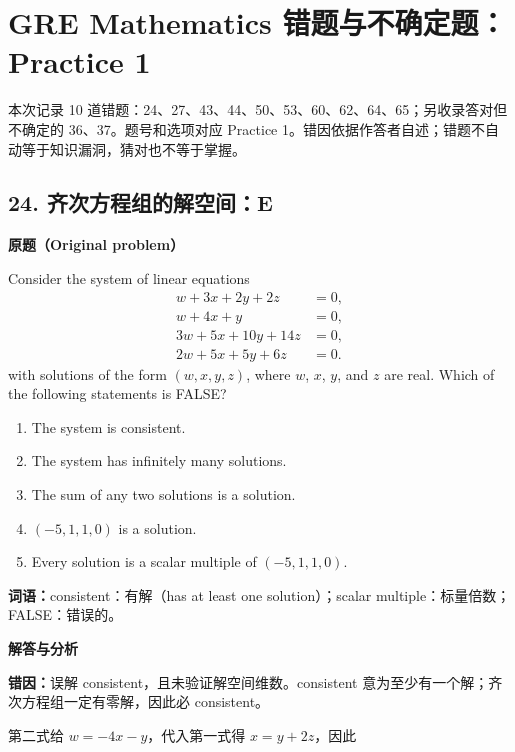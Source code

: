 \documentclass[11pt,a4paper]{ctexart}
\begin{document}
\hypertarget{gre-mathematics-ux9519ux9898ux4e0eux4e0dux786eux5b9aux9898practice-1}{%
\section{GRE Mathematics 错题与不确定题：Practice
1}\label{gre-mathematics-ux9519ux9898ux4e0eux4e0dux786eux5b9aux9898practice-1}}

本次记录 10
道错题：24、27、43、44、50、53、60、62、64、65；另收录答对但不确定的
36、37。题号和选项对应 Practice
1。错因依据作答者自述；错题不自动等于知识漏洞，猜对也不等于掌握。

\hypertarget{ux9f50ux6b21ux65b9ux7a0bux7ec4ux7684ux89e3ux7a7aux95f4e}{%
\subsection{24.
齐次方程组的解空间：E}\label{ux9f50ux6b21ux65b9ux7a0bux7ec4ux7684ux89e3ux7a7aux95f4e}}

\textbf{原题（Original problem）}\par
Consider the system of linear equations
\[\begin{aligned}w+3x+2y+2z&=0,\\ w+4x+y&=0,\\ 3w+5x+10y+14z&=0,\\ 2w+5x+5y+6z&=0.\end{aligned}\]
with solutions of the form $(w,x,y,z)$, where $w$, $x$, $y$, and $z$ are real. Which of the following statements is FALSE?
\begin{enumerate}[label=(\Alph*)]
\item The system is consistent. \item The system has infinitely many solutions. \item The sum of any two solutions is a solution. \item $(-5,1,1,0)$ is a solution. \item Every solution is a scalar multiple of $(-5,1,1,0)$.
\end{enumerate}
\textbf{词语：}consistent：有解（has at least one solution）；scalar multiple：标量倍数；FALSE：错误的。

\textbf{解答与分析}\par


\textbf{错因：}误解 consistent，且未验证解空间维数。consistent
意为至少有一个解；齐次方程组一定有零解，因此必 consistent。

第二式给 \(w=-4x-y\)，代入第一式得 \(x=y+2z\)，因此
\end{document}
